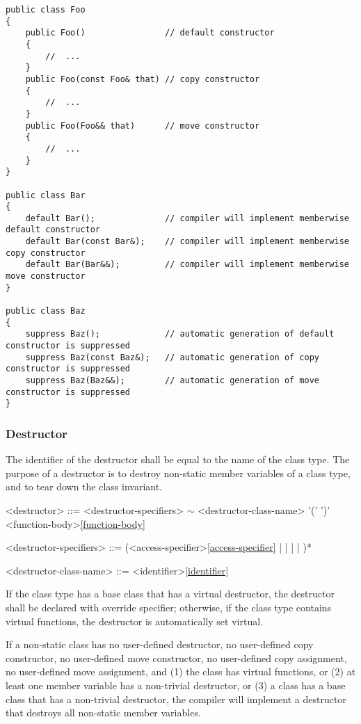\documentclass[a4paper,oneside,11pt]{article}
\begin{document}
\begin{lstlisting}[frame=trBL]
public class Foo
{
    public Foo()                // default constructor
    {
        //  ...
    }
    public Foo(const Foo& that) // copy constructor
    {
        //  ...
    }
    public Foo(Foo&& that)      // move constructor
    {
        //  ...
    }
}

public class Bar
{
    default Bar();              // compiler will implement memberwise default constructor
    default Bar(const Bar&);    // compiler will implement memberwise copy constructor
    default Bar(Bar&&);         // compiler will implement memberwise move constructor
}

public class Baz
{
    suppress Baz();             // automatic generation of default constructor is suppressed
    suppress Baz(const Baz&);   // automatic generation of copy constructor is suppressed
    suppress Baz(Baz&&);        // automatic generation of move constructor is suppressed
}
\end{lstlisting}

\subsubsection{Destructor}

The identifier of the destructor shall be equal to the name of the class type.
The purpose of a destructor is to destroy non-static member variables of a class type,
and to tear down the class invariant.

\begin{grammar}
\label{destructor}<destructor> ::= <destructor-specifiers> $\sim$ <destructor-class-name> '(' ')' <function-body>\ref{function-body}

<destructor-specifiers> ::= (<access-specifier>\ref{access-specifier} |  |  |  | )*

<destructor-class-name> ::= <identifier>\ref{identifier}
\end{grammar}

If the class type has a base class that has a virtual destructor, the destructor shall be declared with override specifier;
otherwise, if the class type contains virtual functions, the destructor is automatically set virtual.

If a non-static class has no user-defined destructor,
no user-defined copy constructor, no user-defined move constructor, no user-defined copy assignment, no user-defined move assignment, and
(1) the class has virtual functions,
or (2) at least one member variable has a non-trivial destructor,
or (3) a class has a base class that has a non-trivial destructor,
the compiler will implement a destructor that destroys all non-static member variables.
\end{document}
